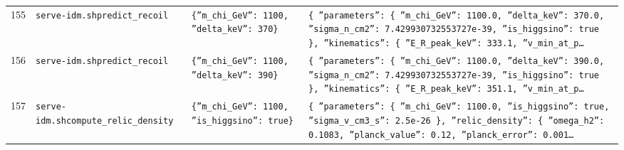 \documentclass[11pt,a4paper]{article}
\begin{document}
\begin{longtable}{@{}p{}p{}p{}p{}@{}}
155 & \texttt{serve-idm.sh}\newline\texttt{predict\_\allowbreak{}recoil} & \texttt{\{''m\_\allowbreak{}chi\_\allowbreak{}GeV'':\allowbreak{} 1100,\allowbreak{} ''delta\_\allowbreak{}keV'':\allowbreak{} 370\}\allowbreak{}} & \texttt{\{   ''parameters'':\allowbreak{} \{     ''m\_\allowbreak{}chi\_\allowbreak{}GeV'':\allowbreak{} 1100.0,\allowbreak{}     ''delta\_\allowbreak{}keV'':\allowbreak{} 370.0,\allowbreak{}     ''sigma\_\allowbreak{}n\_\allowbreak{}cm2'':\allowbreak{} 7.429930732553727e-39,\allowbreak{}     ''is\_\allowbreak{}higgsino'':\allowbreak{} true   \}\allowbreak{},\allowbreak{}   ''kinematics'':\allowbreak{} \{     ''E\_\allowbreak{}R\_\allowbreak{}peak\_\allowbreak{}keV'':\allowbreak{} 333.1,\allowbreak{}     ''v\_\allowbreak{}min\_\allowbreak{}at\_\allowbreak{}p\ldots{}\allowbreak{}} \\
156 & \texttt{serve-idm.sh}\newline\texttt{predict\_\allowbreak{}recoil} & \texttt{\{''m\_\allowbreak{}chi\_\allowbreak{}GeV'':\allowbreak{} 1100,\allowbreak{} ''delta\_\allowbreak{}keV'':\allowbreak{} 390\}\allowbreak{}} & \texttt{\{   ''parameters'':\allowbreak{} \{     ''m\_\allowbreak{}chi\_\allowbreak{}GeV'':\allowbreak{} 1100.0,\allowbreak{}     ''delta\_\allowbreak{}keV'':\allowbreak{} 390.0,\allowbreak{}     ''sigma\_\allowbreak{}n\_\allowbreak{}cm2'':\allowbreak{} 7.429930732553727e-39,\allowbreak{}     ''is\_\allowbreak{}higgsino'':\allowbreak{} true   \}\allowbreak{},\allowbreak{}   ''kinematics'':\allowbreak{} \{     ''E\_\allowbreak{}R\_\allowbreak{}peak\_\allowbreak{}keV'':\allowbreak{} 351.1,\allowbreak{}     ''v\_\allowbreak{}min\_\allowbreak{}at\_\allowbreak{}p\ldots{}\allowbreak{}} \\
157 & \texttt{serve-idm.sh}\newline\texttt{compute\_\allowbreak{}relic\_\allowbreak{}density} & \texttt{\{''m\_\allowbreak{}chi\_\allowbreak{}GeV'':\allowbreak{} 1100,\allowbreak{} ''is\_\allowbreak{}higgsino'':\allowbreak{} true\}\allowbreak{}} & \texttt{\{   ''parameters'':\allowbreak{} \{     ''m\_\allowbreak{}chi\_\allowbreak{}GeV'':\allowbreak{} 1100.0,\allowbreak{}     ''is\_\allowbreak{}higgsino'':\allowbreak{} true,\allowbreak{}     ''sigma\_\allowbreak{}v\_\allowbreak{}cm3\_\allowbreak{}s'':\allowbreak{} 2.5e-26   \}\allowbreak{},\allowbreak{}   ''relic\_\allowbreak{}density'':\allowbreak{} \{     ''omega\_\allowbreak{}h2'':\allowbreak{} 0.1083,\allowbreak{}     ''planck\_\allowbreak{}value'':\allowbreak{} 0.12,\allowbreak{}     ''planck\_\allowbreak{}error'':\allowbreak{} 0.001\ldots{}\allowbreak{}} \\

\end{longtable}
\end{document}
